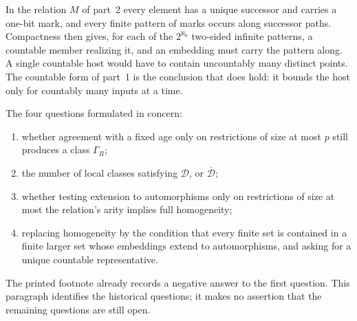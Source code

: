 In the relation \(M\) of part~2 every element has a unique successor and
carries a one-bit mark, and every finite pattern of marks occurs along
successor paths. Compactness then gives, for each of the
\(2^{\aleph_0}\) two-sided infinite patterns, a countable member realizing
it, and an embedding must carry the pattern along. A single countable host
would have to contain uncountably many distinct points. The countable form
of part~1 is the conclusion that does hold: it bounds the host only for
countably many inputs at a time.

The four questions formulated in \cite[\S10.2]{Fraisse1954} concern:
\begin{enumerate}
\item whether agreement with a fixed age only on restrictions of size at
      most \(p\) still produces a class \(\Gamma_R\);
\item the number of local classes satisfying \(\mathcal D\), or
      \(\overline{\mathcal D}\);
\item whether testing extension to automorphisms only on restrictions of
      size at most the relation's arity implies full homogeneity;
\item replacing homogeneity by the condition that every finite set is
      contained in a finite larger set whose embeddings extend to
      automorphisms, and asking for a unique countable representative.
\end{enumerate}
The printed footnote already records a negative answer to the first question.
This paragraph identifies the historical questions; it makes no assertion
that the remaining questions are still open.
